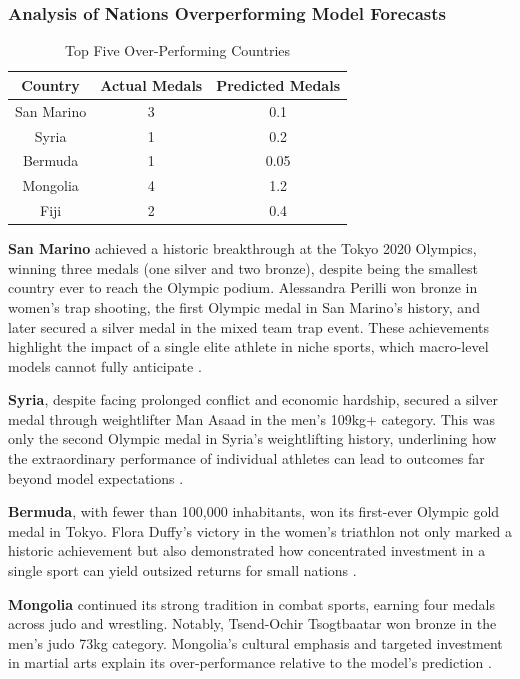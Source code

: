 \documentclass[11pt,twoside]{article}
\numberwithin{Theorem}{section}
\numberwithin{Definition}{section}
\numberwithin{Lemma}{section}
\numberwithin{Algorithm}{section}
\numberwithin{equation}{section}
\begin{document}
\subsubsection{Analysis of Nations Overperforming Model Forecasts}

\begin{table}[H]
\centering
\caption{Top Five Over-Performing Countries}
\label{tab:over}
\begin{tabular}{ccc}
\hline
Country & Actual Medals & Predicted Medals \\
\hline
San Marino & 3 & 0.1 \\
Syria & 1 & 0.2 \\
Bermuda & 1 & 0.05 \\
Mongolia & 4 & 1.2 \\
Fiji & 2 & 0.4 \\
\hline
\end{tabular}
\end{table}

\textbf{San Marino} achieved a historic breakthrough at the Tokyo 2020 Olympics, winning three medals (one silver and two bronze), despite being the smallest country ever to reach the Olympic podium. Alessandra Perilli won bronze in women’s trap shooting, the first Olympic medal in San Marino’s history, and later secured a silver medal in the mixed team trap event. These achievements highlight the impact of a single elite athlete in niche sports, which macro-level models cannot fully anticipate \citep{gasquez2014}.  

\textbf{Syria}, despite facing prolonged conflict and economic hardship, secured a silver medal through weightlifter Man Asaad in the men’s 109kg+ category. This was only the second Olympic medal in Syria’s weightlifting history, underlining how the extraordinary performance of individual athletes can lead to outcomes far beyond model expectations \citep{Bernard2004}.  

\textbf{Bermuda}, with fewer than 100,000 inhabitants, won its first-ever Olympic gold medal in Tokyo. Flora Duffy’s victory in the women’s triathlon not only marked a historic achievement but also demonstrated how concentrated investment in a single sport can yield outsized returns for small nations \citep{hoffmann2002}.  

\textbf{Mongolia} continued its strong tradition in combat sports, earning four medals across judo and wrestling. Notably, Tsend-Ochir Tsogtbaatar won bronze in the men’s judo 73kg category. Mongolia’s cultural emphasis and targeted investment in martial arts explain its over-performance relative to the model’s prediction \citep{andreff2015}.  
\end{document}

